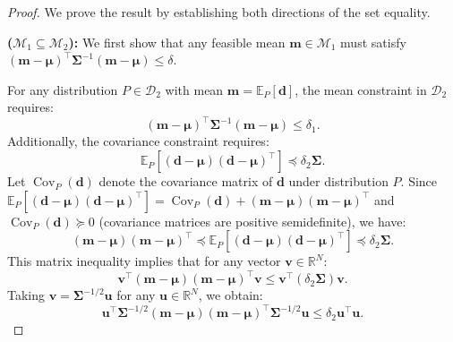 \documentclass[preprint,12pt,authoryear]{elsarticle}
\begin{document}
\begin{proof}
We prove the result by establishing both directions of the set equality.

\textbf{($\mathcal{M}_1 \subseteq \mathcal{M}_2$):} We first show that any feasible mean $\mathbf{m} \in \mathcal{M}_1$ must satisfy $(\mathbf{m} - \boldsymbol{\mu})^\top \boldsymbol{\Sigma}^{-1} (\mathbf{m} - \boldsymbol{\mu}) \leqslant \delta$.

For any distribution $P \in \mathcal{D}_2$ with mean $\mathbf{m} = \mathbb{E}_P[\mathbf{d}]$, the mean constraint in $\mathcal{D}_2$ requires:
\begin{equation}
(\mathbf{m} - \boldsymbol{\mu})^\top \boldsymbol{\Sigma}^{-1} (\mathbf{m} - \boldsymbol{\mu}) \leqslant \delta_1.
\end{equation}
Additionally, the covariance constraint requires:
\begin{equation}
\mathbb{E}_P[(\mathbf{d} - \boldsymbol{\mu})(\mathbf{d} - \boldsymbol{\mu})^\top] \preceq \delta_2 \boldsymbol{\Sigma}.
\end{equation}
Let $\operatorname{Cov}_P(\mathbf{d})$ denote the covariance matrix of $\mathbf{d}$ under distribution $P$. Since $\mathbb{E}_P[(\mathbf{d} - \boldsymbol{\mu})(\mathbf{d} - \boldsymbol{\mu})^\top] = \operatorname{Cov}_P(\mathbf{d}) + (\mathbf{m} - \boldsymbol{\mu})(\mathbf{m} - \boldsymbol{\mu})^\top$ and $\operatorname{Cov}_P(\mathbf{d}) \succeq 0$ (covariance matrices are positive semidefinite), we have:
\begin{equation}
(\mathbf{m} - \boldsymbol{\mu})(\mathbf{m} - \boldsymbol{\mu})^\top \preceq \mathbb{E}_P[(\mathbf{d} - \boldsymbol{\mu})(\mathbf{d} - \boldsymbol{\mu})^\top] \preceq \delta_2 \boldsymbol{\Sigma}.
\end{equation}
This matrix inequality implies that for any vector $\mathbf{v} \in \mathbb{R}^N$:
\begin{equation}
\mathbf{v}^\top (\mathbf{m} - \boldsymbol{\mu})(\mathbf{m} - \boldsymbol{\mu})^\top \mathbf{v} \leqslant \mathbf{v}^\top (\delta_2 \boldsymbol{\Sigma}) \mathbf{v}.
\end{equation}
Taking $\mathbf{v} = \boldsymbol{\Sigma}^{-1/2} \mathbf{u}$ for any $\mathbf{u} \in \mathbb{R}^N$, we obtain:
\begin{equation}
\mathbf{u}^\top \boldsymbol{\Sigma}^{-1/2} (\mathbf{m} - \boldsymbol{\mu})(\mathbf{m} - \boldsymbol{\mu})^\top \boldsymbol{\Sigma}^{-1/2} \mathbf{u} \leqslant \delta_2 \mathbf{u}^\top \mathbf{u}.
\end{equation}

\end{proof}
\end{document}
